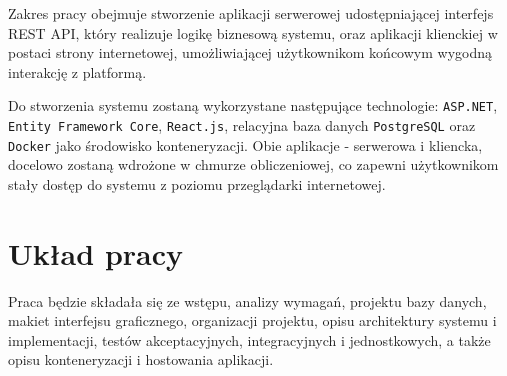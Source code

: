 Zakres pracy obejmuje stworzenie aplikacji serwerowej udostępniającej interfejs REST API, który realizuje logikę biznesową systemu, oraz aplikacji klienckiej w postaci strony internetowej, umożliwiającej użytkownikom końcowym wygodną interakcję z platformą.

Do stworzenia systemu zostaną wykorzystane następujące technologie: \texttt{ASP.NET}, \texttt{Entity Framework Core}, \texttt{React.js}, relacyjna baza danych \texttt{PostgreSQL} oraz \texttt{Docker} jako środowisko konteneryzacji. Obie aplikacje - serwerowa 
i kliencka, docelowo zostaną wdrożone w chmurze obliczeniowej, co zapewni użytkownikom stały dostęp do systemu z poziomu przeglądarki internetowej.

\section{Układ pracy}
Praca będzie składała się ze wstępu, analizy wymagań, projektu bazy danych, makiet interfejsu graficznego,
organizacji projektu, opisu architektury systemu i implementacji, testów akceptacyjnych, integracyjnych i jednostkowych, a także opisu konteneryzacji i hostowania aplikacji.

